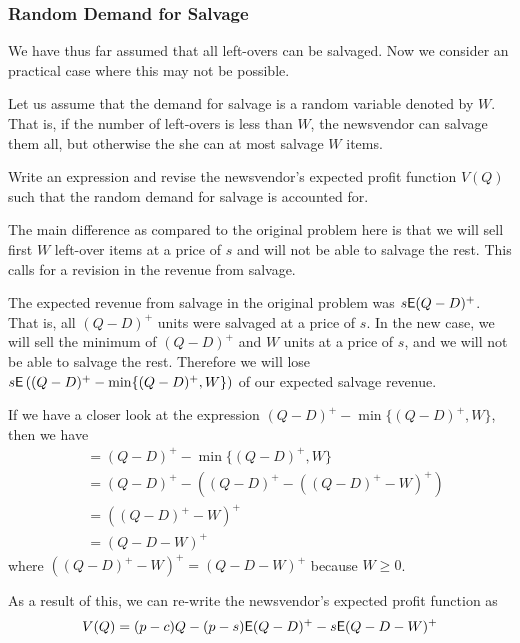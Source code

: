 \subsubsection{Random Demand for Salvage}

We have thus far assumed that all left-overs can be salvaged. Now we consider an practical case where this may not be possible.

\begin{question}
Let us assume that the demand for salvage is a random variable denoted by $W$. That is, if the number of left-overs is less than $W$, the newsvendor can salvage them all, but otherwise the she can at most salvage $W$ items. 

Write an expression and revise the newsvendor's expected profit function $V(Q)$ such that the random demand for salvage is accounted for.
\end{question}

\begin{solution}
The main difference as compared to the original problem here is that we will sell first $W$ left-over items at a price of $s$ and will not be able to salvage the rest. This calls for a revision in the revenue from salvage. 

The expected revenue from salvage in the original problem was $s\mathsf{E} (Q-D)^+$. That is, all $(Q-D)^+$ units were salvaged at a price of $s$. In the new case, we will sell the minimum of $(Q-D)^+$ and $W$ units at a price of $s$, and we will not be able to salvage the rest. Therefore we will lose $s\mathsf{E} \left((Q-D)^+ - \min\{(Q-D)^+,W\}\right)$
of our expected salvage revenue.

If we have a closer look at the expression $(Q-D)^+ - \min\{(Q-D)^+,W\}$, then we have 
\begin{align*}
& = (Q-D)^+ - \min\{(Q-D)^+,W\} \\
& = (Q-D)^+ - \left((Q-D)^+ - ((Q-D)^+-W)^+ \right) \\
& = ((Q-D)^+-W)^+ \\
& = (Q-D-W)^+
\end{align*}
where $((Q-D)^+-W)^+=(Q-D-W)^+$ because $W\geq 0$. 

As a result of this, we can re-write the newsvendor's expected profit function as
\begin{align*}
V(Q) = (p-c)Q - (p-s) \mathsf{E}(Q-D)^+ - s\mathsf{E} (Q-D-W)^+
\end{align*}
\end{solution}


